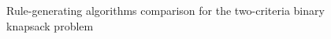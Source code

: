 \begin{figure}
  \centering
  \caption{Rule-generating algorithms comparison for the two-criteria binary knapsack problem}
  \label{c2_bin_algo}
\end{figure}

